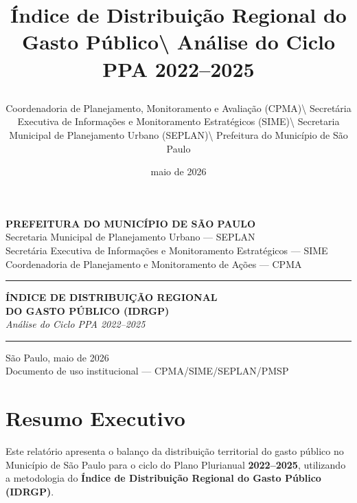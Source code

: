 \documentclass[
  brazilian,
  12pt,
]{article}
\title{\vspace{2cm}

\textbf{Índice de Distribuição Regional do Gasto Público}\textbackslash{}
\large Análise do Ciclo PPA 2022--2025}
\author{Coordenadoria de Planejamento, Monitoramento e Avaliação
(CPMA)\textbackslash{} Secretária Executiva de Informações e
Monitoramento Estratégicos (SIME)\textbackslash{} Secretaria Municipal
de Planejamento Urbano (SEPLAN)\textbackslash{} Prefeitura do Município
de São Paulo}
\date{maio de 2026}
\begin{document}
\maketitle

{
\setcounter{tocdepth}{2}
\tableofcontents
}
\thispagestyle{empty}

\begin{center}

\vspace*{1cm}

{\large \textbf{PREFEITURA DO MUNICÍPIO DE SÃO PAULO}}\\[0.3cm]
{\normalsize Secretaria Municipal de Planejamento Urbano — SEPLAN}\\[0.1cm]
{\normalsize Secretária Executiva de Informações e Monitoramento Estratégicos — SIME}\\[0.1cm]
{\normalsize Coordenadoria de Planejamento e Monitoramento de Ações — CPMA}

\vspace{3cm}

\textcolor{pmsp}{\rule{12cm}{2pt}}

\vspace{0.8cm}

{\LARGE \textbf{ÍNDICE DE DISTRIBUIÇÃO REGIONAL}}\\[0.4cm]
{\LARGE \textbf{DO GASTO PÚBLICO (IDRGP)}}\\[1.2cm]
{\large \textit{Análise do Ciclo PPA 2022–2025}}

\vspace{0.8cm}

\textcolor{pmsp}{\rule{12cm}{2pt}}

\vspace{3.5cm}

{\normalsize São Paulo, maio de 2026}\\[0.2cm]
{\small Documento de uso institucional — CPMA/SIME/SEPLAN/PMSP}

\end{center}

\newpage

\newpage

\setcounter{page}{1}
\pagestyle{fancy}

\section{Resumo Executivo}\label{resumo-executivo}

Este relatório apresenta o balanço da distribuição territorial do gasto
público no Município de São Paulo para o ciclo do Plano Plurianual
\textbf{2022--2025}, utilizando a metodologia do \textbf{Índice de
Distribuição Regional do Gasto Público (IDRGP)}.
\end{document}
